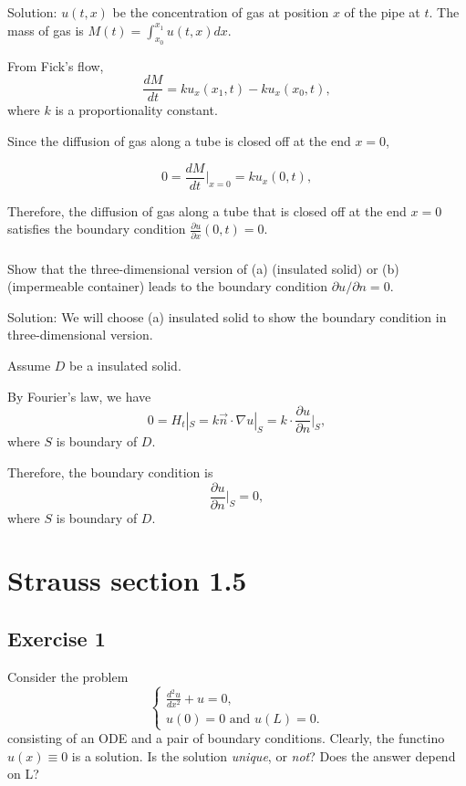 \documentclass{article}
\begin{document}
		Solution: $u(t,x)$ be the concentration of gas at position $x$ of the pipe at $t$.
        The mass of gas is $M(t)= \int_{x_0}^{x_1} u(t,x)dx$.
		
		From Fick's flow, 
        \[ \frac{dM}{dt}=ku_{x}(x_{1},t)- ku_{x}(x_{0},t),\]
		where $k$ is a proportionality constant.

		Since the diffusion of gas along a tube is closed off at the end $x=0$,

       \[0= \frac{dM}{dt}|_ {x=0}= ku_{x}(0,t),\]

	   Therefore, the diffusion of gas along a tube that is closed off at the end $x=0$ satisfies the boundary condition $ \frac{\partial u}{\partial x}(0,t)=0.$

	\subsubsection{}
Show that the three-dimensional version of (a) (insulated solid) or (b) (impermeable container) leads to the boundary condition $\partial u/ \partial n=0$.
		
		Solution: We will choose (a) insulated solid to show the boundary condition in three-dimensional version.
	    
		Assume $D$ be a insulated solid.
		 
		By Fourier's law, we have 
		 \[0= H_{t}|_{S}= k\vec{n}\cdot \nabla u |_{S}=k\cdot \frac{\partial u}{\partial n}|_{S}, \]
        where $S$ is boundary of $D$.

		Therefore, the boundary condition is \[ \frac{\partial u}{\partial n}|_{S}=0,\]
		where $S$ is boundary of $D$.

\section{Strauss section 1.5}
\subsection{Exercise 1}
Consider the problem
		\begin{equation*}
			\begin{cases}
				\frac{d^2u}{dx^2}+u = 0,
				\\
				u(0)=0 \text{ and } u(L)=0.
			\end{cases}
		\end{equation*}
		consisting of an ODE and a pair of boundary
		conditions. Clearly, the functino $u(x) \equiv 0$ is a
		solution. Is the solution \textit{unique}, or \textit{not}?
	Does the answer depend on L?
\end{document}

